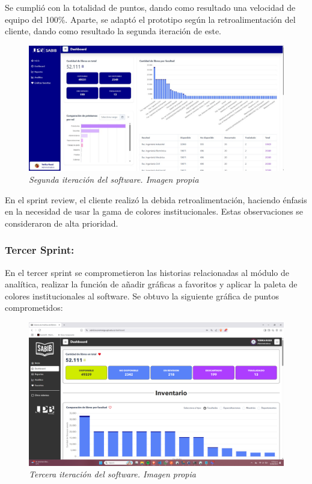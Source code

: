 \documentclass[spanish]{ieee_upb}
\begin{document}
Se cumplió con la totalidad de puntos, dando como resultado una velocidad de equipo del 100\%. Aparte, se adaptó el prototipo
según la retroalimentación del cliente, dando como resultado la segunda iteración de este.

\begin{figure}[htpb] 
	\centering
	\includegraphics[width=0.8\linewidth]{img/UX/s2-1.jpg}
	\vspace{-1mm}
	\caption[Segunda iteración del software]{\textit{Segunda iteración del software. Imagen propia}}
	\label{fig:S2-1} 
\end{figure}

En el sprint review, el cliente realizó la debida retroalimentación, haciendo énfasis en la necesidad de usar la gama
de colores institucionales. Estas observaciones se consideraron de alta prioridad.

\subsubsection{Tercer Sprint: }

En el tercer sprint se comprometieron las historias relacionadas al módulo de analítica, realizar la función de añadir 
gráficas a favoritos y aplicar la paleta de colores institucionales al software. Se obtuvo la siguiente gráfica de puntos comprometidos:

\begin{figure}[htpb] 
	\centering
	\includegraphics[width=0.8\linewidth]{img/UX/s3-1.png}
	\vspace{-1mm}
	\caption[Tercera iteración del software]{\textit{Tercera iteración del software. Imagen propia}}
	\label{fig:S3-1} 
\end{figure}
\end{document}

